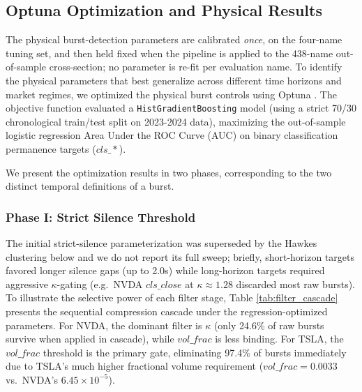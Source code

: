 \documentclass[11pt]{article}
\begin{document}
\subsection{Optuna Optimization and Physical Results}
\label{sec:optuna}
The physical burst-detection parameters are calibrated \emph{once}, on the four-name tuning set, and then held fixed when the pipeline is applied to the 438-name out-of-sample cross-section; no parameter is re-fit per evaluation name. To identify the physical parameters that best generalize across different time horizons and market regimes, we optimized the physical burst controls using Optuna \citep{optuna2019}. The objective function evaluated a \texttt{HistGradientBoosting} model (using a strict 70/30 chronological train/test split on 2023-2024 data), maximizing the out-of-sample logistic regression Area Under the ROC Curve (AUC) on binary classification permanence targets ($cls\_*$).

We present the optimization results in two phases, corresponding to the two distinct temporal definitions of a burst.

\subsubsection{Phase I: Strict Silence Threshold}
The initial strict-silence parameterization was superseded by the Hawkes clustering below and we do not report its full sweep; briefly, short-horizon targets favored longer silence gaps (up to 2.0s) while long-horizon targets required aggressive $\kappa$-gating (e.g.\ NVDA $cls\_close$ at $\kappa\approx1.28$ discarded most raw bursts). To illustrate the selective power of each filter stage, Table \ref{tab:filter_cascade} presents the sequential compression cascade under the regression-optimized parameters. For NVDA, the dominant filter is $\kappa$ (only 24.6\% of raw bursts survive when applied in cascade), while $vol\_frac$ is less binding. For TSLA, the $vol\_frac$ threshold is the primary gate, eliminating 97.4\% of bursts immediately due to TSLA's much higher fractional volume requirement ($vol\_frac = 0.0033$ vs.\ NVDA's $6.45 \times 10^{-5}$).
\end{document}
